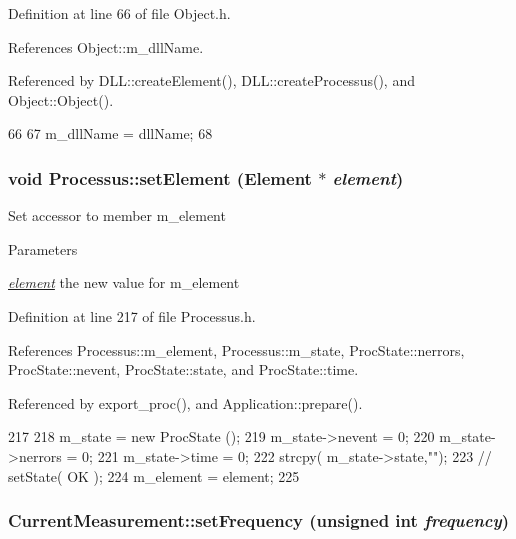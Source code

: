 Definition at line 66 of file Object.h.

References Object::m\_\-dllName.

Referenced by DLL::createElement(), DLL::createProcessus(), and Object::Object().


\begin{DoxyCode}
66                                       {
67     m_dllName = dllName;
68   }
\end{DoxyCode}
\hypertarget{classProcessus_a8ddef94227d83d9dae2cd49aebc33353}{
\subsubsection[{setElement}]{\setlength{\rightskip}{0pt plus 5cm}void Processus::setElement ({\bf Element} $\ast$ {\em element})}}
\label{classProcessus_a8ddef94227d83d9dae2cd49aebc33353}
Set accessor to member m\_\-element 
\begin{DoxyParams}{Parameters}
\item[{\em \hyperlink{namespaceelement}{element}}]the new value for m\_\-element \end{DoxyParams}


Definition at line 217 of file Processus.h.

References Processus::m\_\-element, Processus::m\_\-state, ProcState::nerrors, ProcState::nevent, ProcState::state, and ProcState::time.

Referenced by export\_\-proc(), and Application::prepare().


\begin{DoxyCode}
217                                      {
218     m_state = new ProcState ();
219     m_state->nevent  = 0;
220     m_state->nerrors = 0;
221     m_state->time    = 0;
222     strcpy( m_state->state,"");
223     //  setState( OK );
224     m_element = element;
225   }
\end{DoxyCode}
\hypertarget{classCurrentMeasurement_ae990f376398bc25891eaddcb245fdf46}{
\subsubsection[{setFrequency}]{ CurrentMeasurement::setFrequency (unsigned int {\em frequency})}}
\label{classCurrentMeasurement_ae990f376398bc25891eaddcb245fdf46}


